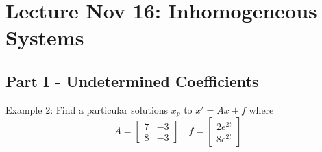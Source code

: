 \documentclass[12pt]{article}
\begin{document}
\section{Lecture Nov 16: Inhomogeneous Systems}
\subsection*{Part I - Undetermined Coefficients}
Example 2: Find a particular solutions $x_p$ to $x' = Ax + f$ where 
\[A = \begin{bmatrix}
    7 & -3\\
    8 & -3
\end{bmatrix} \quad f = \begin{bmatrix}
    2e^{2t}\\
    8e^{2t}
\end{bmatrix}\]
\end{document}
